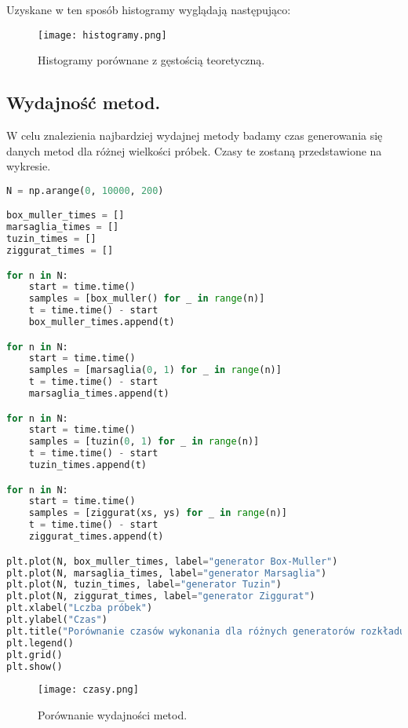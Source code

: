 \documentclass[12pt,letterpaper]{article}
\theoremstyle{definition}
\begin{document}
Uzyskane w ten sposób histogramy wyglądają następująco:
\begin{figure}[H]
			\centering

				\centering
				\texttt{[image: histogramy.png]}
				\caption{Histogramy porównane z gęstością teoretyczną.}
				\label{fig:zdjecie1}
			\hfill
		\end{figure}

\subsection{Wydajność metod.}
W celu znalezienia najbardziej wydajnej metody badamy czas generowania się danych metod dla różnej wielkości próbek. Czasy te zostaną przedstawione na wykresie.
\begin{lstlisting}[language=Python, caption=Porównanie wydajności metod]
N = np.arange(0, 10000, 200)

box_muller_times = []
marsaglia_times = []
tuzin_times = []
ziggurat_times = []

for n in N:
    start = time.time()
    samples = [box_muller() for _ in range(n)]
    t = time.time() - start
    box_muller_times.append(t)

for n in N:
    start = time.time()
    samples = [marsaglia(0, 1) for _ in range(n)]
    t = time.time() - start
    marsaglia_times.append(t)

for n in N:
    start = time.time()
    samples = [tuzin(0, 1) for _ in range(n)]
    t = time.time() - start
    tuzin_times.append(t)

for n in N:
    start = time.time()
    samples = [ziggurat(xs, ys) for _ in range(n)]
    t = time.time() - start
    ziggurat_times.append(t)

plt.plot(N, box_muller_times, label="generator Box-Muller")
plt.plot(N, marsaglia_times, label="generator Marsaglia")
plt.plot(N, tuzin_times, label="generator Tuzin")
plt.plot(N, ziggurat_times, label="generator Ziggurat")
plt.xlabel("Lczba próbek")
plt.ylabel("Czas")
plt.title("Porównanie czasów wykonania dla różnych generatorów rozkładu normalnego")
plt.legend()
plt.grid()
plt.show()
\end{lstlisting}

\begin{figure}[H]
			\centering

				\centering
				\texttt{[image: czasy.png]}
				\caption{Porównanie wydajności metod.}
				\label{fig:zdjecie1}
			\hfill
		\end{figure}
\end{document}
